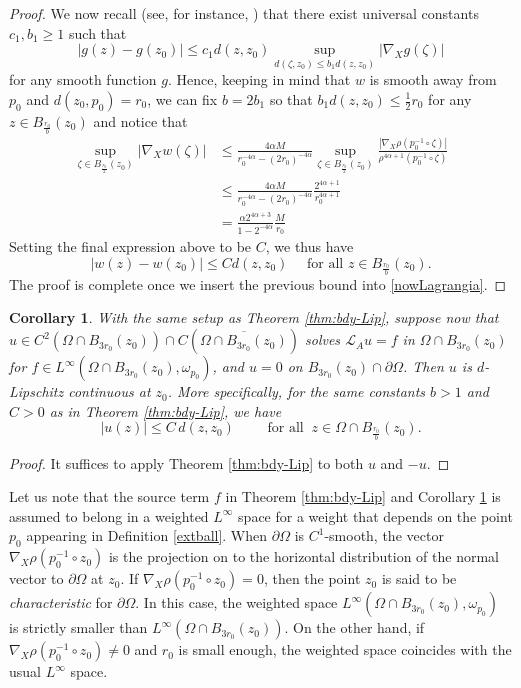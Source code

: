 \documentclass[12pt]{amsart}
\newtheorem{Corollary}[Theorem]{Corollary}
\def \L {\mathcal{L}}
\def \O {\Omega}
\def \a {\alpha}
\begin{document}
\begin{proof}
We now recall (see, for instance, \cite[Theorem 20.3.1]{BLU2007}) that there exist universal constants $c_1, b_1\geq 1$ such that
$$|g(z)-g(z_0)|\leq c_1 d(z,z_0) \sup_{d(\zeta,z_0)\leq b_1 d(z,z_0)}|\nabla_X g(\zeta)|$$
for any smooth function $g$. Hence, keeping in mind that $w$ is smooth away from $p_0$ and $d(z_0,p_0)=r_0$, we can fix $b=2b_1$ so that $b_1d(z,z_0)\leq \frac{1}{2}r_0$ for any $z\in B_{\frac{r_0}{b}}(z_0)$ and notice that
\begin{align*}
\sup_{\zeta\in B_{\frac{r_0}{2}}(z_0)}|\nabla_X w(\zeta)|&\leq \frac{4\a M }{r_0^{-4\a}-(2 r_0)^{-4\a}}\sup_{\zeta\in B_{\frac{r_0}{2}}(z_0)}\frac{|\nabla_X \rho(p_0^{-1}\circ\zeta)|}{\rho^{4\a+1}(p_0^{-1}\circ\zeta)} \\
& \leq \frac{4\a M }{r_0^{-4\a}-(2 r_0)^{-4\a}} \frac{2^{4\a+1}}{r_0^{4\a+1}}\\
& = \frac{\a 2^{4\a+3} }{1-2^{-4\a}} \frac{M}{r_0}
\end{align*}
Setting the final expression above to be $C$, we thus have
$$|w(z)-w(z_0)|\leq C d(z,z_0)\quad \mbox{ for all }z\in B_{\frac{r_0}{b}}(z_0).$$
The proof is complete once we insert the previous bound into \eqref{nowLagrangia}. 
\end{proof}

\begin{Corollary}\label{cor5}
With the same setup as Theorem \ref{thm:bdy-Lip}, suppose now that $u\in C^2(\O \cap B_{3r_0}(z_0))\cap C(\overline{\O \cap B_{3r_0}(z_0)})$ solves $\L_A u= f$ in $\O \cap B_{3r_0}(z_0)$ for $f \in L^{\infty}(\O\cap B_{3r_0}(z_0),\omega_{p_0})$, and $u = 0$ on $B_{3r_0}(z_0) \cap \partial \O$. Then $u$ is $d$-Lipschitz continuous at $z_0$. More specifically, for the same constants $b>1$ and $C>0$ as in Theorem \ref{thm:bdy-Lip}, we have
$$|u(z)| \leq C\, d(z, z_0) \qquad \text{ for all } \ z \in \O\cap B_{\frac{r_0}{b}}(z_0).$$
\end{Corollary}

\begin{proof}
It suffices to apply Theorem \ref{thm:bdy-Lip} to both $u$ and $-u$.
\end{proof}

Let us note that the source term $f$ in Theorem \ref{thm:bdy-Lip} and Corollary \ref{cor5} is assumed to belong in a weighted $L^{\infty}$ space for a weight that depends on the point $p_0$ appearing in Definition \ref{extball}. When $\partial \O$ is $C^1$-smooth, the vector $\nabla_X\rho (p_0^{-1}\circ z_0)$ is the projection on to the horizontal distribution of the normal vector to $\partial \O$ at $z_0$. If $\nabla_X\rho (p_0^{-1}\circ z_0) = 0$, then the point $z_0$ is said to be \emph{characteristic} for $\partial \O$. In this case, the weighted space $L^{\infty}(\O\cap B_{3r_0}(z_0),\omega_{p_0})$ is strictly smaller than $L^{\infty}(\O\cap B_{3r_0}(z_0))$. On the other hand, if $\nabla_X\rho (p_0^{-1}\circ z_0)\neq 0$ and $r_0$ is small enough, the weighted space coincides with the usual $L^\infty$ space. 
\end{document}
